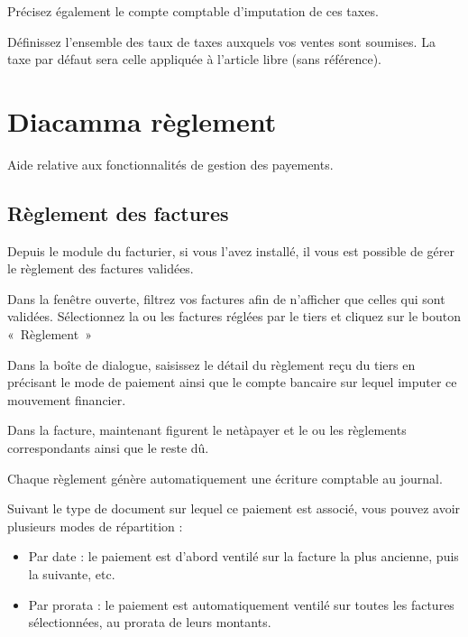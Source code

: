 \documentclass[a4paper,10pt,oneside,french]{sphinxmanual}
\begin{document}
Précisez également le compte comptable d’imputation de ces taxes.

Définissez l’ensemble des taux de taxes auxquels vos ventes sont soumises. La taxe par défaut sera celle appliquée à l’article libre (sans référence).


\chapter{Diacamma règlement}
\label{\detokenize{payoff/index:diacamma-reglement}}\label{\detokenize{payoff/index::doc}}
Aide relative aux fonctionnalités de gestion des payements.


\section{Règlement des factures}
\label{\detokenize{payoff/payoff:reglement-des-factures}}\label{\detokenize{payoff/payoff::doc}}
Depuis le module du facturier, si vous l’avez installé, il vous est possible de gérer le règlement des factures validées.
\begin{quote}

\end{quote}

Dans la fenêtre ouverte, filtrez vos factures afin de n’afficher que celles qui sont validées.
Sélectionnez la ou les factures réglées par le tiers et cliquez sur le bouton « Règlement »
\begin{quote}

\noindent{}
\end{quote}

Dans la boîte de dialogue, saisissez le détail du règlement reçu du tiers en précisant le mode de paiement ainsi que le  compte bancaire sur lequel imputer ce mouvement financier.

Dans la facture, maintenant figurent le net\sphinxhyphen{}à\sphinxhyphen{}payer  et le ou les règlements correspondants ainsi que le reste dû.

Chaque règlement génère automatiquement une écriture comptable au journal.
\begin{quote}

\noindent{}
\end{quote}

Suivant le type de document sur lequel ce paiement est associé, vous pouvez avoir plusieurs modes de répartition :
\begin{itemize}
\item {} 
Par date : le paiement est d’abord ventilé sur la facture la plus ancienne, puis la suivante, etc.

\item {} 
Par prorata : le paiement est automatiquement ventilé sur toutes les factures sélectionnées, au prorata de leurs montants.

\end{itemize}
\end{document}
